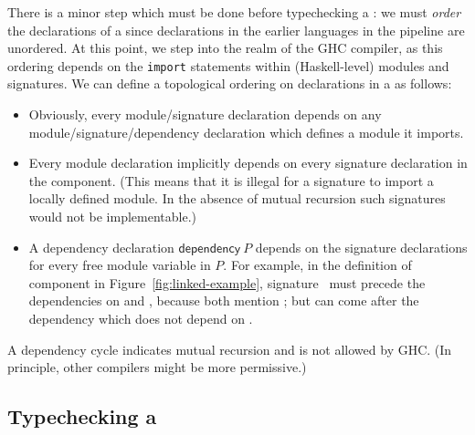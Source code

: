 There is a minor step which must be done before typechecking a
\unit{}: we must \emph{order} the declarations of a \unit{} since declarations in the
earlier languages in the pipeline are unordered.  At this point,
we step into the realm of the GHC compiler, as this ordering depends
on the \texttt{import} statements within (Haskell-level) modules and
signatures.  We can define a topological ordering on declarations in a
\unit{} as follows:

\begin{itemize}
    \item Obviously, every module/signature declaration depends on
    any module/signature/dependency declaration which defines a
    module it imports.
    \item Every module declaration implicitly depends on every signature
    declaration in the component.  (This means that it is illegal for a
    signature to import a locally defined module.  In the absence of
    mutual recursion such signatures would not be implementable.)
    \item A dependency declaration $\textsf{dependency}~P$ depends
    on the signature declarations for every free module variable
    in $P$.  For example, in the definition of component  in
    Figure~\ref{fig:linked-example},
    \textsf{signature}~ must precede the dependencies
    on  and , because both mention ; but
    can come after the  dependency which does not
    depend on .

\end{itemize}
%
A dependency cycle indicates mutual recursion and is not allowed by GHC.
(In principle, other compilers might be more permissive.)

\subsection{Typechecking a \unit{}}
\label{sec:overview-compiler}


